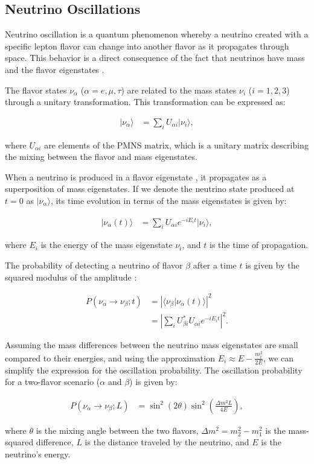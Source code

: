 \subsection{Neutrino Oscillations}

Neutrino oscillation is a quantum phenomenon whereby a neutrino created with a specific lepton flavor can change into another flavor as it propagates through space.
This behavior is a direct consequence of the fact that neutrinos have mass and the flavor eigenstates \cite{Barger_Marfatia_Whisnant_2012}.


The flavor states \(\nu_\alpha\) (\(\alpha = e, \mu, \tau\)) are related to the mass states \(\nu_i\) (\(i = 1, 2, 3\)) through a unitary transformation.
This transformation can be expressed as:

\begin{align}
|\nu_\alpha\rangle &= \sum_{i} U_{\alpha i} |\nu_i\rangle,
\end{align}

where \(U_{\alpha i}\) are elements of the PMNS matrix, which is a unitary matrix describing the mixing between the flavor and mass eigenstates.

When a neutrino is produced in a flavor eigenstate \cite{Cohen_Glashow_Ligeti_2009}, it propagates as a superposition of mass eigenstates\cite{PhysRevD.97.072009}.
If we denote the neutrino state produced at \(t = 0\) as \(|\nu_\alpha\rangle\), its time evolution in terms of the mass eigenstates is given by:

\begin{align}
|\nu_\alpha(t)\rangle &= \sum_{i} U_{\alpha i} e^{-i E_i t} |\nu_i\rangle,
\end{align}

where \(E_i\) is the energy of the mass eigenstate \(\nu_i\), and \(t\) is the time of propagation.

The probability of detecting a neutrino of flavor \(\beta\) after a time \(t\) is given by the squared modulus of the amplitude \cite{Barger_Marfatia_Whisnant_2012}:

\begin{align}
P(\nu_\alpha \to \nu_\beta; t) &= \left| \langle \nu_\beta | \nu_\alpha(t) \rangle \right|^2 \\
&= \left| \sum_{i} U_{\beta i}^* U_{\alpha i} e^{-i E_i t} \right|^2.
\end{align}

Assuming the mass differences between the neutrino mass eigenstates are small compared to their energies, and using the approximation \(E_i \approx E - \frac{m_i^2}{2E}\), we can simplify the expression for the oscillation probability.
The oscillation probability for a two-flavor scenario (\(\alpha\) and \(\beta\)) is given by:

\begin{align}
P(\nu_\alpha \to \nu_\beta; L) &= \sin^2(2\theta) \sin^2\left(\frac{\Delta m^2 L}{4 E}\right),
\end{align}

where \(\theta\) is the mixing angle between the two flavors, \(\Delta m^2 = m_2^2 - m_1^2\) is the mass-squared difference, \(L\) is the distance traveled by the neutrino, and \(E\) is the neutrino's energy.
